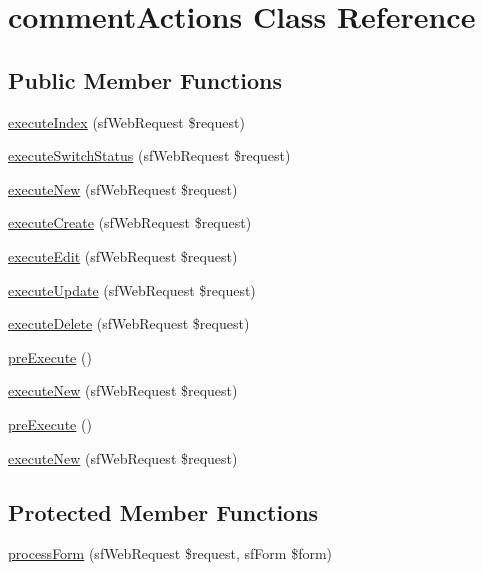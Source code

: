 \hypertarget{classcomment_actions}{\section{comment\-Actions Class Reference}
\label{classcomment_actions}
}
\subsection*{Public Member Functions}
\begin{DoxyCompactItemize}
\item 
\hyperlink{classcomment_actions_a948cc911eb1d9f77990be54af3b2080f}{execute\-Index} (sf\-Web\-Request \$request)
\item 
\hyperlink{classcomment_actions_a84f3809dd64121e2fd999bf9e0c8b2ba}{execute\-Switch\-Status} (sf\-Web\-Request \$request)
\item 
\hyperlink{classcomment_actions_a0ffbea56560c6c633dae68ec22aff21c}{execute\-New} (sf\-Web\-Request \$request)
\item 
\hyperlink{classcomment_actions_a75837617743fb64dca82d8133b2c662a}{execute\-Create} (sf\-Web\-Request \$request)
\item 
\hyperlink{classcomment_actions_af4d8fedd4b28f3398826a1bb8fa54394}{execute\-Edit} (sf\-Web\-Request \$request)
\item 
\hyperlink{classcomment_actions_af7b4f51862add3c2ebb54efc136a0840}{execute\-Update} (sf\-Web\-Request \$request)
\item 
\hyperlink{classcomment_actions_a52b5b11b11a0070dd2662257520c045a}{execute\-Delete} (sf\-Web\-Request \$request)
\item 
\hyperlink{classcomment_actions_a908339bae97157f5ff5535fcb7ccce8a}{pre\-Execute} ()
\item 
\hyperlink{classcomment_actions_a0ffbea56560c6c633dae68ec22aff21c}{execute\-New} (sf\-Web\-Request \$request)
\item 
\hyperlink{classcomment_actions_a908339bae97157f5ff5535fcb7ccce8a}{pre\-Execute} ()
\item 
\hyperlink{classcomment_actions_a0ffbea56560c6c633dae68ec22aff21c}{execute\-New} (sf\-Web\-Request \$request)
\end{DoxyCompactItemize}
\subsection*{Protected Member Functions}
\begin{DoxyCompactItemize}
\item 
\hyperlink{classcomment_actions_a7cf661d837626e0320753cbffa019a01}{process\-Form} (sf\-Web\-Request \$request, sf\-Form \$form)
\end{DoxyCompactItemize}


